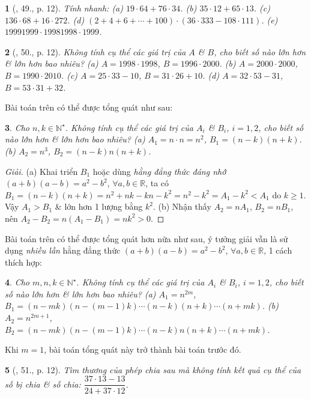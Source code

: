 \documentclass{article}
\newtheorem{baitoan}{}
\begin{document}
\begin{baitoan}[\cite{Binh_Toan_6_tap_1}, 49., p. 12]
	Tính nhanh: (a) $19\cdot64 + 76\cdot34$. (b) $35\cdot12 + 65\cdot13$. (c) $136\cdot68 + 16\cdot272$. (d) $(2 + 4 + 6 + \cdots + 100)\cdot(36\cdot333 - 108\cdot111)$. (e) $19991999\cdot19981998\cdot1999$.
\end{baitoan}

\begin{baitoan}[\cite{Binh_Toan_6_tap_1}, 50., p. 12]
	Không tính cụ thể các giá trị của $A$ \& $B$, cho biết số nào lớn hơn \& lớn hơn bao nhiêu? (a) $A = 1998\cdot1998$, $B = 1996\cdot2000$. (b) $A = 2000\cdot2000$, $B = 1990\cdot2010$. (c) $A = 25\cdot33 - 10$, $B = 31\cdot26 + 10$. (d) $A = 32\cdot53 - 31$, $B = 53\cdot31 + 32$.
\end{baitoan}

Bài toán trên có thể được tổng quát như sau:

\begin{baitoan}
	Cho $n,k\in\mathbb{N}^\star$. Không tính cụ thể các giá trị của $A_i$ \& $B_i$, $i = 1,2$, cho biết số nào lớn hơn \& lớn hơn bao nhiêu? (a) $A_1 = n\cdot n = n^2$, $B_1 = (n - k)(n + k)$. (b) $A_2 = n^3$, $B_2 = (n - k)n(n + k)$.
\end{baitoan}

\begin{proof}[Giải]
	(a) Khai triển $B_1$ hoặc dùng \textit{hằng đẳng thức đáng nhớ} $(a + b)(a - b) = a^2 - b^2$, $\forall a,b\in\mathbb{R}$, ta có $B_1 = (n - k)(n + k) = n^2 + nk - kn - k^2 = n^2 - k^2 = A_1 - k^2 < A_1$ do $k\ge 1$. Vậy $A_1 > B_1$ \& lớn hơn 1 lượng bằng $k^2$. (b) Nhận thấy $A_2 = nA_1$, $B_2 = nB_1$, nên $A_2 - B_2 = n(A_1 - B_1) = nk^2 > 0$.
\end{proof}
Bài toán trên có thể được tổng quát hơn nữa như sau, ý tưởng giải vẫn là sử dụng \textit{nhiều lần} hằng đẳng thức $(a + b)(a - b) = a^2 - b^2$, $\forall a,b\in\mathbb{R}$, 1 cách thích hợp:

\begin{baitoan}
	Cho $m,n,k\in\mathbb{N}^\star$. Không tính cụ thể các giá trị của $A_i$ \& $B_i$, $i = 1,2$, cho biết số nào lớn hơn \& lớn hơn bao nhiêu? (a) $A_1 = n^{2m}$, $B_1 = (n - mk)(n - (m - 1)k)\cdots(n - k)(n + k)\cdots(n + mk)$. (b) $A_2 = n^{2m + 1}$, $B_2 = (n - mk)(n - (m - 1)k)\cdots(n - k)n(n + k)\cdots(n + mk)$.
\end{baitoan}
Khi $m = 1$, bài toán tổng quát này trở thành bài toán trước đó.

\begin{baitoan}[\cite{Binh_Toan_6_tap_1}, 51., p. 12]
	Tìm thương của phép chia sau mà không tính kết quả cụ thể của số bị chia \& số chia: $\dfrac{37\cdot13 - 13}{24 + 37\cdot12}$.
\end{baitoan}
\end{document}
